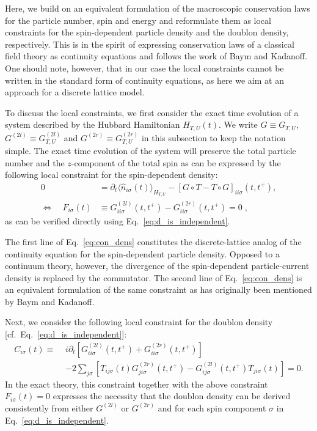 \documentclass[twocolumn,prb,showpacs,aps,superscriptaddress]{revtex4}
\newcommand{\est}[1]{\ensuremath{\langle {#1} \rangle}}
\begin{document}
Here, we build on an equivalent formulation of the macroscopic conservation laws for the particle number, spin and energy and reformulate them as local constraints for the spin-dependent particle density and the doublon density, respectively. 
This is in the spirit of expressing conservation laws of a classical field theory as continuity equations and follows the work of Baym and Kadanoff. \cite{BK61,Bay62} 
One should note, however, that in our case the local constraints cannot be written in the standard form of continuity equations, as here we aim at an approach for a discrete lattice model.

To discuss the local constraints, we first consider the exact time evolution of a system described by the Hubbard Hamiltonian $H_{T,U}(t)$. 
We write $G \equiv G_{T,U}$, $G^{(2l)} \equiv G^{(2l)}_{T,U}$ and $G^{(2r)} \equiv G^{(2r)}_{T,U}$ in this subsection to keep the notation simple.
The exact time evolution of the system will preserve the total particle number and the $z$-component of the total spin as can be expressed by the following local constraint for the spin-dependent density:
\begin{align}
  0
  &=
  \partial_t \est{\hat{n}_{i\sigma}(t)}_{H_{T,U}}
  -
  [G \circ T - T \circ G]_{ii\sigma}(t,t^+),\nonumber\\
  \Leftrightarrow\quad
  F_{i\sigma}(t)
  &\equiv 
  G^{(2l)}_{ii\sigma}(t,t^+) - G^{(2r)}_{ii\sigma}(t,t^+) = 0 \; , 
  \label{eq:con_dens}
\end{align}
as can be verified directly using Eq.\ \eqref{eq:d_is_independent}.

The first line of Eq.\ \eqref{eq:con_dens} constitutes the discrete-lattice analog of the continuity equation for the spin-dependent particle density.
Opposed to a continuum theory, however, the divergence of the spin-dependent particle-current density is replaced by the commutator. 
The second line of Eq.\ \eqref{eq:con_dens} is an equivalent formulation of the same constraint as has originally been mentioned by Baym and Kadanoff. \cite{BK61,Bay62} 

Next, we consider the following local constraint for the doublon density [cf.\ Eq.\ \eqref{eq:d_is_independent}]:
\begin{align}
  \label{eq:con_energy}
  C_{i\sigma}(t)
  \equiv \,\,
  &i\partial_t
  \left[
    G^{(2l)}_{ii\sigma}(t,t^+)
    +
    G^{(2r)}_{ii\sigma}(t,t^+)
  \right]\\
  &
  -
  2\sum_{j\sigma}
  \left[
    T_{ij\sigma}(t)G^{(2r)}_{ji\sigma}(t,t^+)
    -
    G^{(2l)}_{ij\sigma}(t,t^+)T_{ji\sigma}(t)
  \right] = 0.\nonumber
\end{align}
In the exact theory, this constraint together with the above constraint $F_{i\sigma}(t)=0$ expresses the necessity that the doublon density can be derived consistently from either $G^{(2l)}$ or $G^{(2r)}$ and for each spin component $\sigma$ in Eq.\ \eqref{eq:d_is_independent}. 
\end{document}
